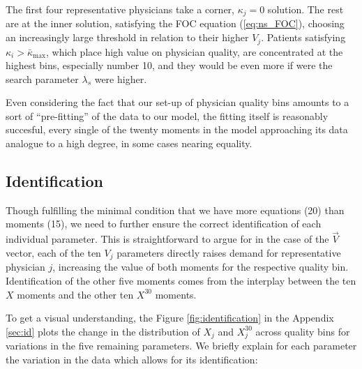 \documentclass[../main.tex]{subfiles}
\begin{document}
The first four representative physicians take a corner, $\kappa_j = 0$ solution. The rest are at the inner solution, satisfying the FOC equation (\ref{eq:ns_FOC}), choosing an increasingly large threshold in relation to their higher $V_j$. Patients satisfying $\kappa_i > \bar{\kappa}_{\max}$, which place high value on physician quality, are concentrated at the highest bins, especially number 10, and they would be even more if were the search parameter $\lambda_s$ were higher.

Even considering the fact that our set-up of physician quality bins amounts to a sort of ``pre-fitting'' of the data to our model, the fitting itself is reasonably succesful, every single of the twenty moments in the model approaching its data analogue to a high degree, in some cases nearing equality.

\subsection{Identification}

Though fulfilling the minimal condition that we have more equations (20) than moments (15), we need to further ensure the correct identification of each individual parameter. This is straightforward to argue for in the case of the $\vec{V}$ vector, each of the ten $V_j$ parameters directly raises demand for representative physician $j$, increasing the value of both moments for the respective quality bin. Identification of the other five moments comes from the interplay between the ten $X$ moments and the other ten $X^{30}$ moments.

To get a visual understanding, the Figure \ref{fig:identification} in the Appendix \ref{sec:id} plots the change in the distribution of $X_j$ and $X_j^{30}$ across quality bins for variations in the five remaining parameters. We briefly explain for each parameter the variation in the data which allows for its identification:
\end{document}
